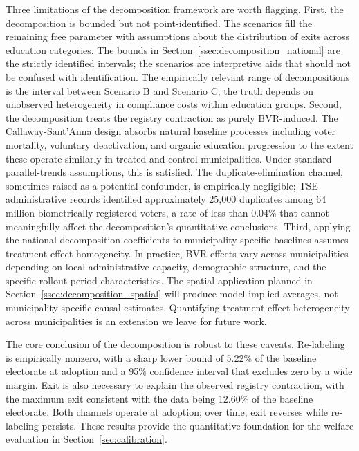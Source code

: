 Three limitations of the decomposition framework are worth flagging. First, the decomposition is bounded but not point-identified. The scenarios fill the remaining free parameter with assumptions about the distribution of exits across education categories. The bounds in Section~\ref{ssec:decomposition_national} are the strictly identified intervals; the scenarios are interpretive aids that should not be confused with identification. The empirically relevant range of decompositions is the interval between Scenario B and Scenario C; the truth depends on unobserved heterogeneity in compliance costs within education groups. Second, the decomposition treats the registry contraction as purely BVR-induced. The Callaway-Sant'Anna design absorbs natural baseline processes including voter mortality, voluntary deactivation, and organic education progression to the extent these operate similarly in treated and control municipalities. Under standard parallel-trends assumptions, this is satisfied. The duplicate-elimination channel, sometimes raised as a potential confounder, is empirically negligible; TSE administrative records identified approximately 25,000 duplicates among 64 million biometrically registered voters, a rate of less than 0.04\% that cannot meaningfully affect the decomposition's quantitative conclusions. Third, applying the national decomposition coefficients to municipality-specific baselines assumes treatment-effect homogeneity. In practice, BVR effects vary across municipalities depending on local administrative capacity, demographic structure, and the specific rollout-period characteristics. The spatial application planned in Section~\ref{ssec:decomposition_spatial} will produce model-implied averages, not municipality-specific causal estimates. Quantifying treatment-effect heterogeneity across municipalities is an extension we leave for future work.

The core conclusion of the decomposition is robust to these caveats. Re-labeling is empirically nonzero, with a sharp lower bound of 5.22\% of the baseline electorate at adoption and a 95\% confidence interval that excludes zero by a wide margin. Exit is also necessary to explain the observed registry contraction, with the maximum exit consistent with the data being 12.60\% of the baseline electorate. Both channels operate at adoption; over time, exit reverses while re-labeling persists. These results provide the quantitative foundation for the welfare evaluation in Section~\ref{sec:calibration}.
